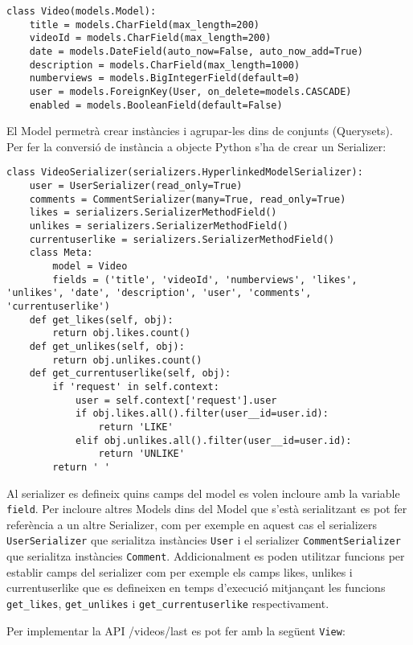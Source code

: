 \documentclass[12pt, titlepage]{article}
\begin{document}
\begin{lstlisting}[breaklines]
class Video(models.Model):
    title = models.CharField(max_length=200)
    videoId = models.CharField(max_length=200)
    date = models.DateField(auto_now=False, auto_now_add=True)
    description = models.CharField(max_length=1000)
    numberviews = models.BigIntegerField(default=0)
    user = models.ForeignKey(User, on_delete=models.CASCADE)
    enabled = models.BooleanField(default=False)
\end{lstlisting}

El Model permetrà crear instàncies i agrupar-les dins de conjunts (Querysets).
Per fer la conversió de instància a objecte Python s'ha de crear un Serializer:

\begin{lstlisting}[breaklines]
class VideoSerializer(serializers.HyperlinkedModelSerializer):
    user = UserSerializer(read_only=True)
    comments = CommentSerializer(many=True, read_only=True)
    likes = serializers.SerializerMethodField()
    unlikes = serializers.SerializerMethodField()
    currentuserlike = serializers.SerializerMethodField()
    class Meta:
        model = Video
        fields = ('title', 'videoId', 'numberviews', 'likes', 'unlikes', 'date', 'description', 'user', 'comments', 'currentuserlike')
    def get_likes(self, obj):
        return obj.likes.count()
    def get_unlikes(self, obj):
        return obj.unlikes.count()
    def get_currentuserlike(self, obj):
        if 'request' in self.context:
            user = self.context['request'].user
            if obj.likes.all().filter(user__id=user.id):
                return 'LIKE'
            elif obj.unlikes.all().filter(user__id=user.id):
                return 'UNLIKE'
        return ' '
\end{lstlisting}

Al serializer es defineix quins camps del model es volen incloure amb la variable
\verb|field|. Per incloure altres Models dins del Model que s'està serialitzant
es pot fer referència a un altre Serializer, com per exemple en aquest cas el
serializers \verb|UserSerializer| que serialitza instàncies \verb|User| i el serializer
\verb|CommentSerializer| que serialitza instàncies \verb|Comment|. Addicionalment es
poden utilitzar funcions per establir camps del serializer com per exemple els camps
likes, unlikes i currentuserlike que es defineixen en temps d'execució mitjançant les
funcions \verb|get_likes|, \verb|get_unlikes| i \verb|get_currentuserlike|
respectivament.

Per implementar la API /videos/last es pot fer amb la següent \verb|View|:
\end{document}
